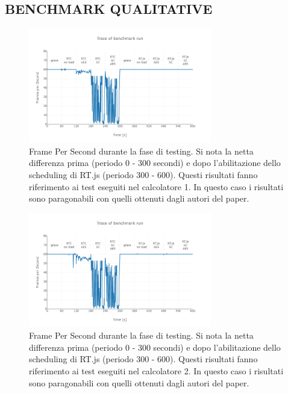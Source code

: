 \documentclass[conference]{IEEEtran}
\begin{document}
    \subsection{BENCHMARK QUALITATIVE}
    \begin{figure}[hbt!]
    \includegraphics[width=8cm]{qualitative_1.png}
    \centering
    \caption{Frame Per Second durante la fase di testing. Si nota la netta differenza prima (periodo 0 - 300 secondi) e dopo l’abilitazione dello scheduling di RT.js (periodo 300 - 600). Questi risultati fanno riferimento ai test eseguiti nel calcolatore 1. In questo caso i risultati sono paragonabili con quelli ottenuti dagli autori del paper.}
    \end{figure}
    
    \begin{figure}[hbt!]
    \includegraphics[width=8cm]{qualitative_2.png}
    \centering
    \caption{Frame Per Second durante la fase di testing. Si nota la netta differenza prima (periodo 0 - 300 secondi) e dopo l’abilitazione dello scheduling di RT.js (periodo 300 - 600). Questi risultati fanno riferimento ai test eseguiti nel calcolatore 2. In questo caso i risultati sono paragonabili con quelli ottenuti dagli autori del paper.}
    \end{figure}
    
\end{document}
